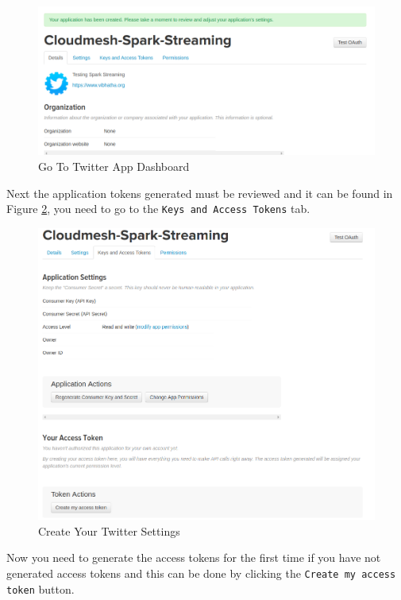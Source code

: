 \begin{figure}[htbp]\label{fig:twitter-app-dashboard}
\centering
\includegraphics[width=1.0\textwidth]{images/twitter-app-dashboard.png}
\caption{Go To Twitter App Dashboard}
\end{figure}

Next the application tokens generated must be reviewed and it can be
found in Figure \ref{fig:twitter-app-token}, you need to go to the
\verb|Keys and Access Tokens| tab.

\begin{figure}[htbp]\label{fig:twitter-app-token}
\centering
\includegraphics[width=1.0\textwidth]{images/twitter-create-token.png}
\caption{Create Your Twitter Settings}
\end{figure}

Now you need to generate the access tokens for the first time if you
have not generated access tokens and this can be done by clicking the
\verb|Create my access token| button.

